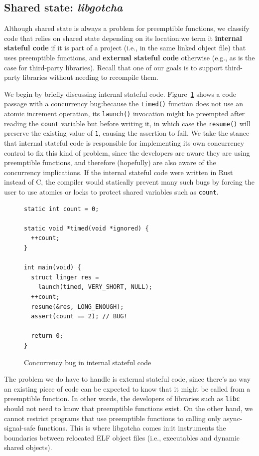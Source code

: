 \subsection{Shared state: \textit{libgotcha}}
\label{sec:libgotcha}

Although shared state is always a problem for preemptible functions, we classify code
that relies on shared state depending on its location:\@ we term it \textbf{internal
stateful code} if it is part of a project (i.e., in the same linked object file)
that uses preemptible functions, and \textbf{external stateful code} otherwise (e.g.,
as is the case for third-party libraries).  Recall that one of our goals is to
support third-party libraries without needing to recompile them.

We begin by briefly discussing internal stateful code.  Figure~\ref{fig:ingerbug} shows
a code passage with a concurrency bug:\@ because the \texttt{timed()} function does
not use an atomic increment operation, its \texttt{launch()} invocation might be
preempted after reading the \texttt{count} variable but before writing it, in which
case the \texttt{resume()} will preserve the existing value of \texttt{1}, causing
the assertion to fail.  We take the stance that internal stateful code is responsible
for implementing its own concurrency control to fix this kind of problem, since the
developers are aware they are using preemptible functions, and therefore (hopefully)
are also aware of the concurrency implications.  If the internal stateful code were
written in Rust instead of C, the compiler would statically prevent many such bugs by
forcing the user to use atomics or locks to protect shared variables such as
\texttt{count}.

\begin{figure}
\begin{verbatim}
static int count = 0;

static void *timed(void *ignored) {
  ++count;
}

int main(void) {
  struct linger res =
    launch(timed, VERY_SHORT, NULL);
  ++count;
  resume(&res, LONG_ENOUGH);
  assert(count == 2); // BUG!

  return 0;
}
\end{verbatim}
\caption{Concurrency bug in internal stateful code}
\label{fig:ingerbug}
\end{figure}

The problem we do have to handle is external stateful code, since there's no way an
existing piece of code can be expected to know that it might be called from a
preemptible function.  In other words, the developers of libraries such as
\texttt{libc} should not need to know that preemptible functions exist.  On the other
hand, we cannot restrict programs that use preemptible functions to calling only
async-signal-safe functions.  This is where libgotcha comes in:\@ it instruments the
boundaries between relocated ELF object files (i.e., executables and dynamic shared
objects).

